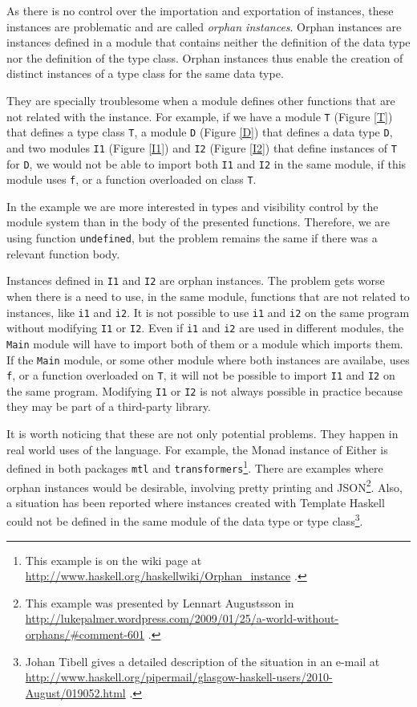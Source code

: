 \documentclass[msc]{ppgccufmg}
\begin{document}
As there is no control over the importation and exportation of instances, these instances are problematic and are called \emph{orphan instances}.
Orphan instances are instances defined in a module that contains neither the definition of the data type nor the definition of the type class.
Orphan instances thus enable the creation of distinct instances of a type class for the same data type.

They are specially troublesome when a module defines other functions that are
not related with the instance.  For example, if we have a module \texttt{T}
(Figure \ref{T}) that defines a type class \texttt{T}, a module \texttt{D} (Figure \ref{D}) that defines a data
type \texttt{D}, and two modules \texttt{I1} (Figure \ref{I1}) and
\texttt{I2} (Figure \ref{I2}) that define
instances of \texttt{T} for \texttt{D}, we would not be able to import both
\texttt{I1} and \texttt{I2} in the same
module, if this module uses \texttt{f}, or a function overloaded on
  class \texttt{T}.

In the example we are more interested in types and visibility control
by the module system than in the body of the presented functions.
Therefore, we are using function \texttt{undefined}, but the problem
remains the same if there was a relevant function body.

Instances defined in \texttt{I1} and \texttt{I2} are orphan instances.
The problem gets worse when there is a need to use, in the same
module, functions that are not related to instances, like \texttt{i1}
and \texttt{i2}.  It is not possible to use \texttt{i1} and \texttt{i2} on
the same program without modifying \texttt{I1} or \texttt{I2}. Even if \texttt{i1}
and \texttt{i2} are used in different modules, the \texttt{Main} module will
have to import both of them or a module which imports them.  If the
\texttt{Main} module, or some other module where both instances are availabe,
uses \texttt{f}, or a function overloaded on \texttt{T}, it will not be possible
to import \texttt{I1} and \texttt{I2} on the same program.  Modifying
\texttt{I1} or \texttt{I2} is not always possible in practice because they
may be part of a third-party library.

It is worth noticing that these are not only potential problems. They
happen in real world uses of the language.  For example, the Monad
instance of Either is defined in both packages \texttt{mtl} and
\texttt{transformers}\footnote{This example is on the wiki page at
  \url{http://www.haskell.org/haskellwiki/Orphan_instance} .}.  There
are examples where orphan instances would be desirable, involving
pretty printing and JSON\footnote{This example was presented by
  Lennart Augustsson in
  \url{http://lukepalmer.wordpress.com/2009/01/25/a-world-without-orphans/\#comment-601}
  .}.  Also, a situation has been reported where instances created
with Template Haskell could not be defined in the same module of the
data type or type class\footnote{Johan Tibell gives a detailed
  description of the situation in an e-mail at
  \url{http://www.haskell.org/pipermail/glasgow-haskell-users/2010-August/019052.html}
  .}.
\end{document}
